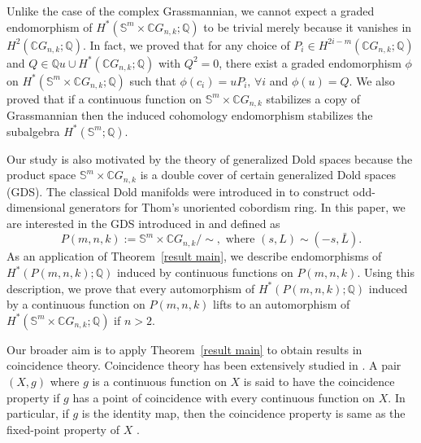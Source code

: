 \documentclass{amsart}
\newcommand{\thmref}[1]{Theorem~\ref{#1}}
\begin{document}
	Unlike %
the case of the complex Grassmannian, we cannot expect a graded
	endomorphism of $H^*(\mathbb S^m \times \mathbb CG_{n,k};\mathbb Q)$ to be
	trivial merely because it vanishes in $H^2(\mathbb{C}G_{n,k}; \mathbb{Q})$. 
	In fact, we proved that for any choice of $P_i \in H^{2i-m}(\mathbb{C}G_{n,k};\mathbb{Q})$ and $Q\in \mathbb Qu\cup  H^*(\mathbb CG_{n,k};\mathbb Q)$ with $Q^2=0$, there exist a graded endomorphism $\phi$ on $H^*(\mathbb S^m \times \mathbb CG_{n,k};\mathbb Q)$ such that $\phi(c_i) = uP_i, \, \forall i$ and $\phi(u)=Q$.
	We also proved that if a continuous function on $\mathbb S^m \times \mathbb CG_{n,k}$ stabilizes a copy of Grassmannian then the induced cohomology endomorphism stabilizes %
the subalgebra $H^*(\mathbb S^m ;\mathbb Q)$.
	
	Our study is also motivated by the theory of generalized Dold spaces %
because the product space $\mathbb S^m \times \mathbb CG_{n,k}$ is a double cover of certain  generalized Dold spaces (GDS). %
	The classical Dold manifolds were introduced in \cite{dold} to construct odd-dimensional generators for Thom's unoriented cobordism ring. In this paper, we are interested in the GDS introduced in \cite{nath-sankaran} and defined as  %
	\[
	P(m,n,k):=\mathbb S^m\times \mathbb CG_{n,k}/\!\!\sim, \text { where } (s,L)\sim (-s,\bar L).
	\]
	As an application of \thmref{result main}, we describe endomorphisms of $H^*(P(m,n,k);\mathbb{Q})$ induced by continuous functions on $P(m,n,k)$. Using this description, we prove that every automorphism of $H^*(P(m,n,k);\mathbb{Q})$ induced by a continuous function on $P(m,n,k)$ lifts to an automorphism of $H^*(\mathbb S^m\times \mathbb CG_{n,k}; \mathbb{Q})$ if $n>2$. 
	
	Our broader aim is to apply \thmref{result main} to obtain results in coincidence theory. Coincidence theory has been extensively studied in \cite{hoffman-noncoin, glover-homer coin, wong}. %
	A pair $(X,g)$ where $g$ is a continuous function on $X$ is said to have the coincidence property if $g$ has a point of coincidence with every continuous function on $X$. In particular, if $g$ is the identity map, then the coincidence property is same as the fixed-point property of $X$%
.
	
\end{document}
